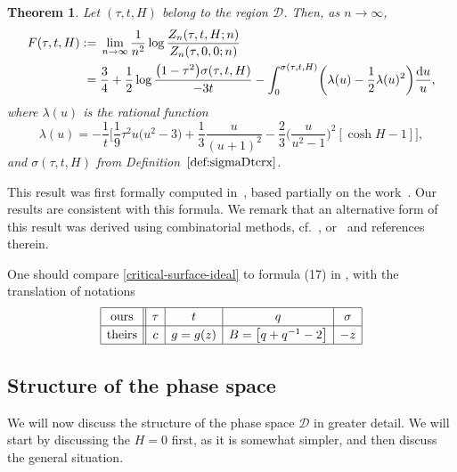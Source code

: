 \documentclass[10pt,a4paper]{amsart}
\numberwithin{equation}{section}
\newtheorem{Theorem}{Theorem}[section]
\begin{document}
\begin{Theorem}\label{main-theorem}
 Let $(\tau,t,H)$ belong to the region $\mathcal D$. Then, as $n\to \infty$,
 \begin{align}\label{Kazakov-Free-Energy}
 F(\tau,t,H):={}&\lim_{n\to \infty} \frac{1}{n^2}\log \frac{ Z_{n}(\tau,t,H;n) }{ Z_{n}(\tau,0,0;n)} \nonumber \\
={}& \frac{3}{4} + \frac{1}{2}\log \frac{\bigl(1-\tau^2\bigr)\sigma(\tau,t,H)}{-3t} - \int_{0}^{\sigma(\tau,t,H)}\biggl(\lambda(u)-\frac{1}{2}\lambda(u)^2\biggr) \frac{{\rm d}u}{u},
\end{align}
 where $\lambda(u)$ is the rational function
 \begin{equation*}
 \lambda(u) = -\frac{1}{t}\biggl[\frac{1}{9}\tau^2u\bigl(u^2-3\bigr) + \frac{1}{3}\frac{u}{(u+1)^2} - \frac{2}{3}\biggl(\frac{u}{u^2-1}\biggr)^2[\cosh H -1]\biggr],
 \end{equation*}
 and $\sigma(\tau,t,H)$ from Definition~$\ref{def:sigmaDtcrx}$.
 \end{Theorem}

 This result was first formally computed in~\cite{Kazakov2, Kazakov1}, based partially on the work~\cite{Mehta}. Our results are consistent with this formula. We remark that an alternative form of this result was derived using combinatorial methods, cf.~\cite{BDFG}, or~\cite{Eynard-book}
 and references therein.
 \begin{Remark}
 One should compare \eqref{critical-surface-ideal} to formula (17) in \cite{Kazakov2}, with the translation of notations
$$\renewcommand{\arraystretch}{1.2}
 \begin{array}{|c||c|c|c|c|}
 \hline
 \text{ours} & \tau & t & q & \sigma\\
 \hline
 \text{theirs} & c & g = g(z) & B = \bigl[q+q^{-1}-2\bigr] & -z\\
 \hline
 \end{array}
$$
 \end{Remark}
 \subsection{Structure of the phase space}
 We will now discuss the structure of the phase space $\mathcal D$ in greater detail. We will start by discussing the $H=0$ first, as it is somewhat simpler, and then discuss the general situation.
\end{document}
